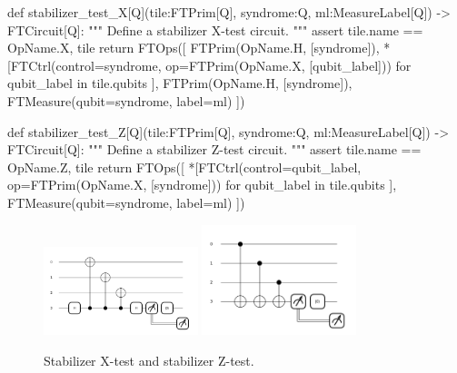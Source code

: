   \begin{python}
  def stabilizer_test_X[Q](tile:FTPrim[Q], syndrome:Q, ml:MeasureLabel[Q]) -> FTCircuit[Q]:
    """ Define a stabilizer X-test circuit. """
    assert tile.name == OpName.X, tile
    return FTOps([
      FTPrim(OpName.H, [syndrome]),
      *[FTCtrl(control=syndrome, op=FTPrim(OpName.X, [qubit_label]))
        for qubit_label in tile.qubits
      ],
      FTPrim(OpName.H, [syndrome]),
      FTMeasure(qubit=syndrome, label=ml)
    ])

  def stabilizer_test_Z[Q](tile:FTPrim[Q], syndrome:Q, ml:MeasureLabel[Q]) -> FTCircuit[Q]:
    """ Define a stabilizer Z-test circuit. """
    assert tile.name == OpName.Z, tile
    return FTOps([
      *[FTCtrl(control=qubit_label, op=FTPrim(OpName.X, [syndrome]))
        for qubit_label in tile.qubits
      ],
      FTMeasure(qubit=syndrome, label=ml)
    ])
  \end{python}

\begin{figure}[h!]
  \centering
  \includegraphics[width=0.4\textwidth]{../img/stabilizer_test_X.png}
  \includegraphics[width=0.4\textwidth]{../img/stabilizer_test_Z.png}
  \caption{Stabilizer X-test and stabilizer Z-test.}
\end{figure}

